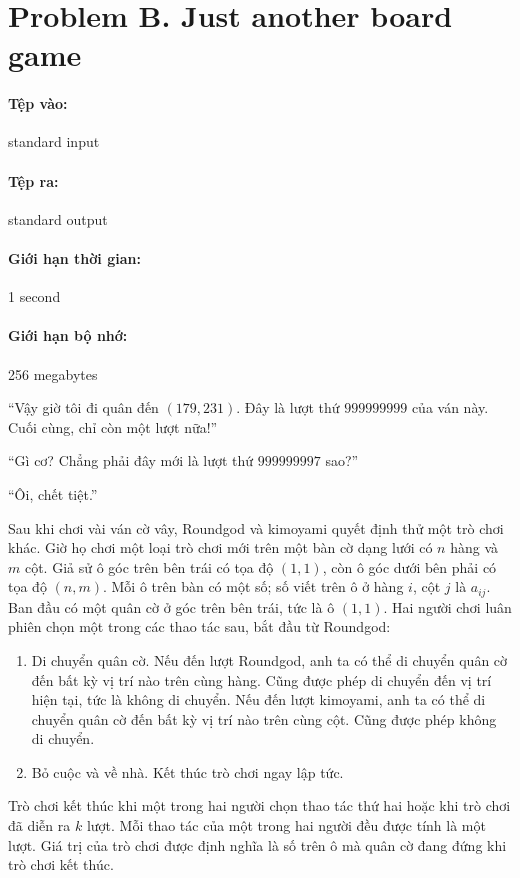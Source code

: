 \documentclass[11pt]{article}
\begin{document}
\section{Problem B. Just another board game}

\paragraph{Tệp vào:} standard input
\paragraph{Tệp ra:} standard output
\paragraph{Giới hạn thời gian:} 1 second
\paragraph{Giới hạn bộ nhớ:} 256 megabytes

``Vậy giờ tôi đi quân đến \((179,231)\). Đây là lượt thứ \(999999999\) của
ván này. Cuối cùng, chỉ còn một lượt nữa!''

``Gì cơ? Chẳng phải đây mới là lượt thứ \(999999997\) sao?''

``Ôi, chết tiệt.''

Sau khi chơi vài ván cờ vây, Roundgod và kimoyami quyết định thử một trò chơi
khác. Giờ họ chơi một loại trò chơi mới trên một bàn cờ dạng lưới có \(n\)
hàng và \(m\) cột. Giả sử ô góc trên bên trái có tọa độ \((1,1)\), còn ô góc
dưới bên phải có tọa độ \((n,m)\). Mỗi ô trên bàn có một số; số viết trên ô ở
hàng \(i\), cột \(j\) là \(a_{ij}\). Ban đầu có một quân cờ ở góc trên bên
trái, tức là ô \((1,1)\). Hai người chơi luân phiên chọn một trong các thao
tác sau, bắt đầu từ Roundgod:
\begin{enumerate}
  \item Di chuyển quân cờ. Nếu đến lượt Roundgod, anh ta có thể di chuyển quân
  cờ đến bất kỳ vị trí nào trên cùng hàng. Cũng được phép di chuyển đến vị trí
  hiện tại, tức là không di chuyển. Nếu đến lượt kimoyami, anh ta có thể di
  chuyển quân cờ đến bất kỳ vị trí nào trên cùng cột. Cũng được phép không di
  chuyển.
  \item Bỏ cuộc và về nhà. Kết thúc trò chơi ngay lập tức.
\end{enumerate}

Trò chơi kết thúc khi một trong hai người chọn thao tác thứ hai hoặc khi trò
chơi đã diễn ra \(k\) lượt. Mỗi thao tác của một trong hai người đều được tính
là một lượt. Giá trị của trò chơi được định nghĩa là số trên ô mà quân cờ đang
đứng khi trò chơi kết thúc.
\end{document}
